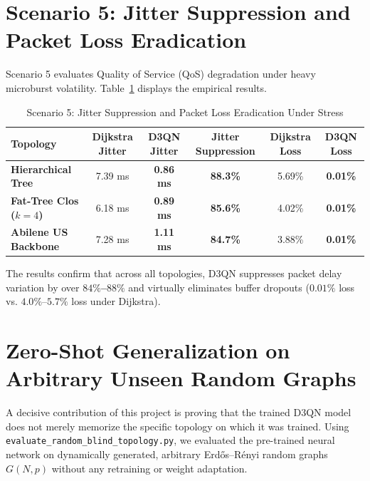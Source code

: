 \section{Scenario 5: Jitter Suppression and Packet Loss Eradication}
Scenario 5 evaluates Quality of Service (QoS) degradation under heavy microburst volatility. Table~\ref{tab:stress_scenario_5} displays the empirical results.

\begin{table}[htbp]
\centering
\caption{Scenario 5: Jitter Suppression and Packet Loss Eradication Under Stress}
\label{tab:stress_scenario_5}
\small
\begin{tabularx}{\textwidth}{l c c c c c}
\toprule
\textbf{Topology} & \textbf{Dijkstra Jitter} & \textbf{D3QN Jitter} & \textbf{Jitter Suppression} & \textbf{Dijkstra Loss} & \textbf{D3QN Loss} \\
\midrule
\textbf{Hierarchical Tree} & 7.39 ms & \textbf{0.86 ms} & \textbf{88.3\%} & 5.69\% & \textbf{0.01\%} \\
\textbf{Fat-Tree Clos ($k=4$)} & 6.18 ms & \textbf{0.89 ms} & \textbf{85.6\%} & 4.02\% & \textbf{0.01\%} \\
\textbf{Abilene US Backbone} & 7.28 ms & \textbf{1.11 ms} & \textbf{84.7\%} & 3.88\% & \textbf{0.01\%} \\
\bottomrule
\end{tabularx}
\end{table}

The results confirm that across all topologies, D3QN suppresses packet delay variation by over \textbf{$84\%$--$88\%$} and virtually eliminates buffer dropouts ($0.01\%$ loss vs. $4.0\%$--$5.7\%$ loss under Dijkstra).

\section{Zero-Shot Generalization on Arbitrary Unseen Random Graphs}
A decisive contribution of this project is proving that the trained D3QN model does not merely memorize the specific topology on which it was trained. Using \texttt{evaluate\_random\_blind\_topology.py}, we evaluated the pre-trained neural network on dynamically generated, arbitrary Erd\H{o}s--R\'enyi random graphs $G(N, p)$ without any retraining or weight adaptation.

